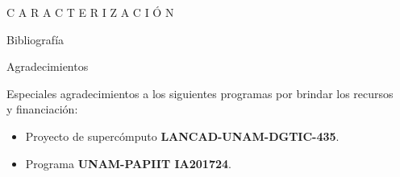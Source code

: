 \documentclass[final]{beamer}
\newlength{\sepwidth}
\newlength{\colwidth}
\newcommand{\separatorcolumn}{\begin{column}{\sepwidth}\end{column}}
\begin{document}
\begin{frame}[t]
\begin{columns}[t]
\begin{column}{\colwidth}
\begin{block}{C A R A C T E R I Z A C I Ó N }{}
			\end{block}	

			\begin{block}{Bibliografía}
				\printbibliography[heading=none]
			\end{block}

			\begin{thm}{Agradecimientos}{}
				
				Especiales agradecimientos a los siguientes programas por brindar los recursos y financiación:
				\begin{itemize}
					\item Proyecto de supercómputo \textbf{LANCAD-UNAM-DGTIC-435}.
					\item Programa \textbf{UNAM-PAPIIT IA201724}.
				\end{itemize}
								
			\end{thm}

		\end{column}
		
		\separatorcolumn
	\end{columns}
\end{frame}
\end{document}
